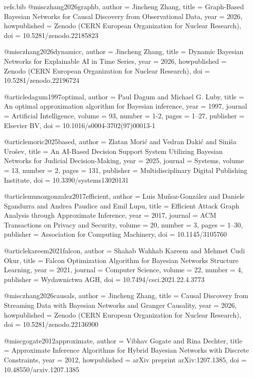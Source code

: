 \begin{filecontents*}[overwrite]{refs.bib}
@misc{zhang2026graphb,
  author = {Jincheng Zhang},
  title = {{Graph-Based Bayesian Networks for Causal Discovery from Observational Data}},
  year = {2026},
  howpublished = {Zenodo (CERN European Organization for Nuclear Research)},
  doi = {10.5281/zenodo.22185823}
}

@misc{zhang2026dynamicc,
  author = {Jincheng Zhang},
  title = {{Dynamic Bayesian Networks for Explainable AI in Time Series}},
  year = {2026},
  howpublished = {Zenodo (CERN European Organization for Nuclear Research)},
  doi = {10.5281/zenodo.22196724}
}

@article{dagum1997optimal,
  author = {Paul Dagum and Michael G. Luby},
  title = {{An optimal approximation algorithm for Bayesian inference}},
  year = {1997},
  journal = {Artificial Intelligence},
  volume = {93},
  number = {1-2},
  pages = {1--27},
  publisher = {Elsevier BV},
  doi = {10.1016/s0004-3702(97)00013-1}
}

@article{moric2025based,
  author = {Zlatan Mori{\'c} and Vedran Daki{\'c} and Sini{\v{s}}a Uro{\v{s}}ev},
  title = {{An AI-Based Decision Support System Utilizing Bayesian Networks for Judicial Decision-Making}},
  year = {2025},
  journal = {Systems},
  volume = {13},
  number = {2},
  pages = {131},
  publisher = {Multidisciplinary Digital Publishing Institute},
  doi = {10.3390/systems13020131}
}

@article{munozgonzalez2017efficient,
  author = {Luis Mu{\~n}oz-Gonz{\'a}lez and Daniele Sgandurra and Andrea Paudice and Emil Lupu},
  title = {{Efficient Attack Graph Analysis through Approximate Inference}},
  year = {2017},
  journal = {ACM Transactions on Privacy and Security},
  volume = {20},
  number = {3},
  pages = {1--30},
  publisher = {Association for Computing Machinery},
  doi = {10.1145/3105760}
}

@article{kareem2021falcon,
  author = {Shahab Wahhab Kareem and Mehmet Cudi Okur},
  title = {{Falcon Optimization Algorithm for Bayesian Networks Structure Learning}},
  year = {2021},
  journal = {Computer Science},
  volume = {22},
  number = {4},
  publisher = {Wydawnictwa AGH},
  doi = {10.7494/csci.2021.22.4.3773}
}

@misc{zhang2026causals,
  author = {Jincheng Zhang},
  title = {{Causal Discovery from Streaming Data with Bayesian Networks and Granger Causality}},
  year = {2026},
  howpublished = {Zenodo (CERN European Organization for Nuclear Research)},
  doi = {10.5281/zenodo.22136900}
}

@misc{gogate2012approximate,
  author = {Vibhav Gogate and Rina Dechter},
  title = {{Approximate Inference Algorithms for Hybrid Bayesian Networks with Discrete Constraints}},
  year = {2012},
  howpublished = {arXiv preprint arXiv:1207.1385},
  doi = {10.48550/arxiv.1207.1385}
}


\end{filecontents*}
